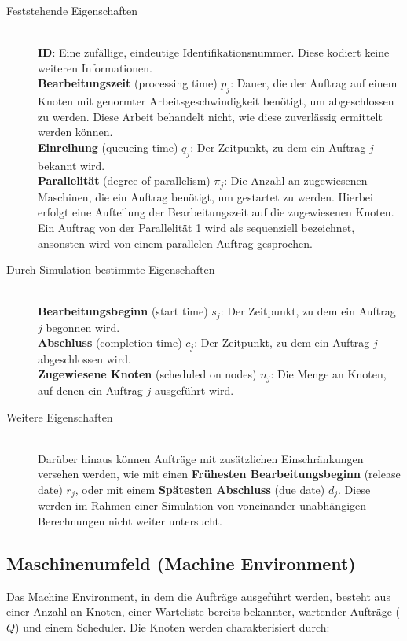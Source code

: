 \begin{description}
\item[Feststehende Eigenschaften] \hfil \\
\textbf{ID}: Eine zufällige, eindeutige Identifikationsnummer. Diese kodiert keine weiteren Informationen.\\
\textbf{Bearbeitungszeit} (processing time) $p_j$: Dauer, die der Auftrag auf einem Knoten mit genormter Arbeitsgeschwindigkeit benötigt, um abgeschlossen zu werden. Diese Arbeit behandelt nicht, wie diese zuverlässig ermittelt werden können. \\
\textbf{Einreihung} (queueing time) $q_j$: Der Zeitpunkt, zu dem ein Auftrag $j$ bekannt wird.\\
\textbf{Parallelität} (degree of parallelism) $\pi_j$: Die Anzahl an zugewiesenen Maschinen, die ein Auftrag benötigt, um gestartet zu werden. Hierbei erfolgt eine Aufteilung der Bearbeitungszeit auf die zugewiesenen Knoten. Ein Auftrag von der Parallelität 1 wird als sequenziell bezeichnet, ansonsten wird von einem parallelen Auftrag gesprochen.\\
\item[Durch Simulation bestimmte Eigenschaften]\hfill \\ 
\textbf{Bearbeitungsbeginn} (start time) $s_j$: Der Zeitpunkt, zu dem ein Auftrag $j$ begonnen wird. \\
\textbf{Abschluss} (completion time) $c_j$: Der Zeitpunkt, zu dem ein Auftrag $j$ abgeschlossen wird.\\
\textbf{Zugewiesene Knoten} (scheduled on nodes) $n_j$: Die Menge an Knoten, auf denen ein Auftrag $j$ ausgeführt wird.\\

\item[Weitere Eigenschaften] \hfil \\
Darüber hinaus können Aufträge mit zusätzlichen Einschränkungen versehen werden, wie mit einen \textbf{Frühesten Bearbeitungsbeginn} (release date) $r_j$, oder mit einem \textbf{Spätesten Abschluss} (due date) $d_j$. Diese werden im Rahmen einer Simulation von voneinander unabhängigen Berechnungen nicht weiter untersucht.
\end{description}

\subsection{Maschinenumfeld (Machine Environment)}
Das Machine Environment, in dem die Aufträge ausgeführt werden, besteht aus einer Anzahl an Knoten, einer Warteliste bereits bekannter, wartender Aufträge ($Q$) und einem Scheduler. Die Knoten werden charakterisiert durch:

